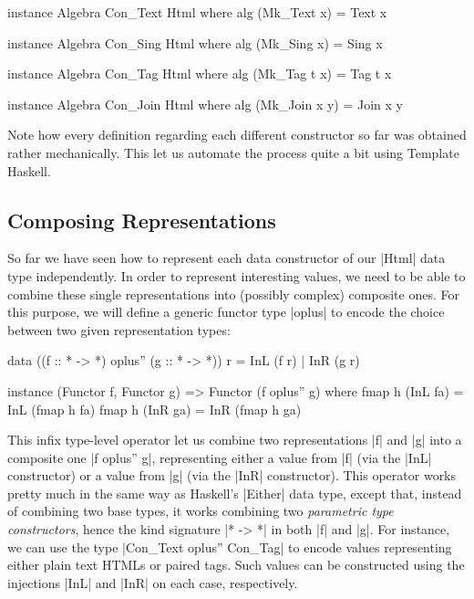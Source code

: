 \begin{code}
instance Algebra Con_Text Html where
  alg (Mk_Text x) = Text x

instance Algebra Con_Sing Html where
  alg (Mk_Sing x) = Sing x

instance Algebra Con_Tag Html where
  alg (Mk_Tag t x) = Tag t x

instance Algebra Con_Join Html where
  alg (Mk_Join x y) = Join x y
\end{code}


Note how every definition regarding each different constructor so far was
obtained rather mechanically.
%
This let us automate the process quite a bit using Template Haskell.


%
\subsection{Composing Representations}

So far we have seen how to represent each data constructor of our |Html| data
type independently.
%
In order to represent interesting values, we need to be able to combine these
single representations into (possibly complex) composite ones.
%
For this purpose, we will define a generic functor type |oplus| to encode the
choice between two given representation types:

\begin{code}
data ((f :: * -> *) oplus'' (g :: * -> *)) r = InL (f r) | InR (g r)

instance (Functor f, Functor g) => Functor (f oplus'' g)
  where  fmap h (InL fa) = InL (fmap h fa)
         fmap h (InR ga) = InR (fmap h ga)

\end{code}
%
This infix type-level operator let us combine two representations |f| and |g|
into a composite one |f oplus'' g|, representing either a value from |f| (via
the |InL| constructor) or a value from |g| (via the |InR| constructor).
%
This operator works pretty much in the same way as Haskell's |Either| data type,
except that, instead of combining two base types, it works combining two
\emph{parametric type constructors}, hence the kind signature |* -> *| in both
|f| and |g|.
%
For instance, we can use the type |Con_Text oplus'' Con_Tag| to encode values
representing either plain text HTMLs or paired tags.
%
Such values can be constructed using the injections |InL| and |InR| on each
case, respectively.
%


